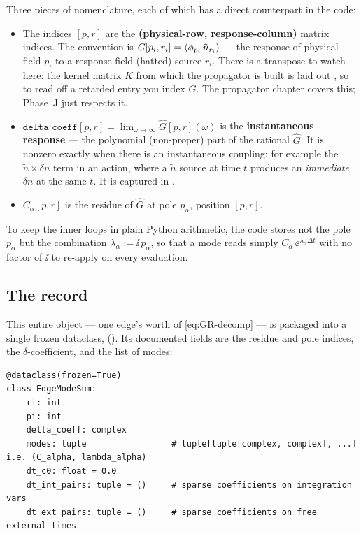 Three pieces of nomenclature, each of which has a direct counterpart in the
code:

\begin{itemize}
  \item The indices $[p, r]$ are the \textbf{(physical-row, response-column)}
        matrix indices. The convention is $G[p_i, r_i] = \left\langle \phi_{p_i}\,
        \tilde n_{r_i} \right\rangle$ --- the response of physical field $p_i$ to a
        response-field (hatted) source $r_i$. There is a transpose to watch
        here: the kernel matrix $K$ from which the propagator is built is laid
        out , so to read off a retarded entry you index
        $G$. The propagator chapter covers this; Phase~J just
        respects it.
  \item $\texttt{delta\_coeff}[p,r] = \lim_{\omega\to\infty}\widehat{G}[p,r](\omega)$
        is the \textbf{instantaneous response} --- the polynomial (non-proper)
        part of the rational $\widehat{G}$. It is nonzero exactly when there is
        an instantaneous coupling: for example the $\tilde n \times \delta n$
        term in an \msrjd{} action, where a $\tilde n$ source at time $t$
        produces an \emph{immediate} $\delta n$ at the same $t$. It is captured
        in .
  \item $C_\alpha[p,r]$ is the residue of $\widehat{G}$ at pole $p_\alpha$,
        position $[p,r]$.
\end{itemize}

To keep the inner loops in plain Python arithmetic, the code stores not the pole
$p_\alpha$ but the combination $\lambda_\alpha := \ii\, p_\alpha$, so that a mode
reads simply $C_\alpha\,\ee^{\lambda_\alpha \Delta t}$ with no factor of $\ii$ to
re-apply on every evaluation.

\subsection{The  record}

This entire object --- one edge's worth of \eqref{eq:GR-decomp} --- is packaged
into a single frozen dataclass, 
(). Its documented fields are the residue and pole
indices, the $\delta$-coefficient, and the list of modes:

\begin{lstlisting}
@dataclass(frozen=True)
class EdgeModeSum:
    ri: int
    pi: int
    delta_coeff: complex
    modes: tuple                 # tuple[tuple[complex, complex], ...]  i.e. (C_alpha, lambda_alpha)
    dt_c0: float = 0.0
    dt_int_pairs: tuple = ()     # sparse coefficients on integration vars
    dt_ext_pairs: tuple = ()     # sparse coefficients on free external times
\end{lstlisting}

